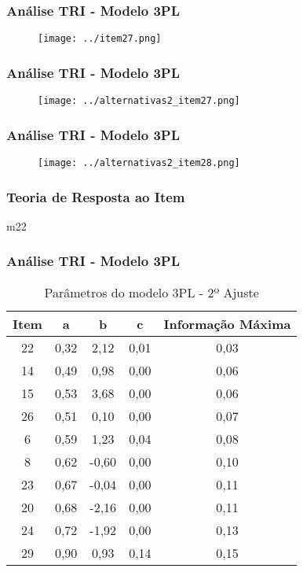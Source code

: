 \documentclass{beamer}
\begin{document}
	\begin{frame}
		
		\frametitle{Análise TRI - Modelo 3PL}
		
		\begin{figure}
			\texttt{[image: ../item27.png]}
		\end{figure}
		
	\end{frame}
	
	\begin{frame}
		
	\frametitle{Análise TRI - Modelo 3PL}
		
		\begin{figure}
				\texttt{[image: ../alternativas2\_item27.png]}
		\end{figure}
		
	\end{frame}
	

	\begin{frame}
	
	\frametitle{Análise TRI - Modelo 3PL}
	
	\begin{figure}
		\texttt{[image: ../alternativas2\_item28.png]}
	\end{figure}
	
	\end{frame}
	\begin{frame}
		
	 \frametitle{Teoria de Resposta ao Item}
		
		m22
		
	\end{frame}	
	
	
\begin{frame}
	\frametitle{Análise TRI - Modelo 3PL}
	
	\begin{table}[ht]
		\centering
			\caption{Parâmetros do modelo 3PL - 2º Ajuste}
		\scriptsize %
		\begin{tabular}{ccccc}
			\hline
			\textbf{Item} & \textbf{a} & \textbf{b} & \textbf{c} & \textbf{Informação Máxima} \\ 
			\hline 
			22 & 0,32 & 2,12 & 0,01 & 0,03 \\ 
			14 & 0,49 & 0,98 & 0,00 & 0,06 \\ 
			15 & 0,53 & 3,68 & 0,00 & 0,06 \\ 
			26 & 0,51 & 0,10 & 0,00 & 0,07 \\ 
			6  & 0,59 & 1,23 & 0,04 & 0,08 \\ 
			8  & 0,62 & -0,60 & 0,00 & 0,10 \\ 
			23 & 0,67 & -0,04 & 0,00 & 0,11 \\ 
			20 & 0,68 & -2,16 & 0,00 & 0,11 \\ 
			24 & 0,72 & -1,92 & 0,00 & 0,13 \\ 
			29 & 0,90 & 0,93 & 0,14 & 0,15 \\ 
			\hline
		\end{tabular}%
	\end{table}
	
\end{frame}
\end{document}

